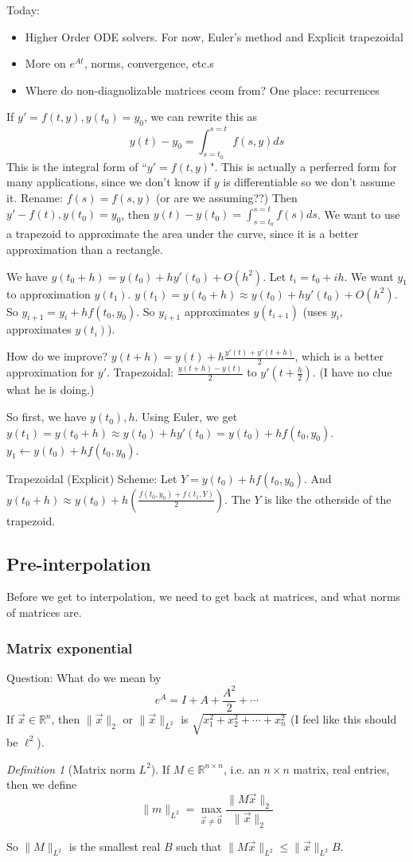 \documentclass{article}
\theoremstyle{plain}
\theoremstyle{remark}
\newtheorem{definition}{Definition}
\newcommand{\R}{{\mathbb R}}
\begin{document}
Today:
\begin{itemize}
	\item Higher Order ODE solvers. For now, Euler's method and Explicit trapezoidal
	\item More on $e^{At}$, norms, convergence, etc.s
	\item Where do non-diagnolizable matrices ceom from? One place: recurrences
\end{itemize}

If $y' = f(t,y), y(t_0) = y_0$,
we can rewrite this as
\[
	y(t) - y_0 = \int_{s=t_0}^{s=t} f(s,y) ds
\]
This is the integral form of ``$y' = f(t,y)$".
This is actually a perferred form for many applications,
since we don't know if $y$ is differentiable so we don't assume it.
Rename: $f(s) = f(s,y)$ (or are we assuming??)
Then $y' - f(t), y(t_0) = y_0$,
then $y(t) - y(t_0) = \int_{s=t_0}^{s=t} f(s)ds$.
We want to use a trapezoid to approximate the area under the curve,
since it is a better approximation than a rectangle.

We have $y(t_0 + h) = y(t_0) + hy'(t_0) + O(h^2)$.
Let $t_i = t_0 + ih$.
We want $y_1$ to approximation $y(t_1)$.
$y(t_1) = y(t_0 + h) \approx y(t_0) + hy'(t_0) + O(h^2)$.
So $y_{i+1} = y_i + hf(t_0,y_0)$.
So $y_{i+1}$ approximates $y(t_{i+1})$
(uses $y_i$, approximates $y(t_i)$).

How do we improve?
$y(t+h) = y(t) + h\frac{y'(t)+y'(t+h)}{2}$,
which is a better approximation for $y'$.
Trapezoidal:
$\frac{y(t+h)-y(t)}{2}$ to $y'(t+\frac{h}{2})$.
(I have no clue what he is doing.)

So first, we have $y(t_0), h$.
Using Euler, we get $y(t_1) = y(t_0+h)
\approx y(t_0) + hy'(t_0) = y(t_0) + hf(t_0,y_0)$.
$y_1 \leftarrow y(t_0) + hf(t_0,y_0)$.

Trapezoidal (Explicit) Scheme:
Let $Y = y(t_0) + hf(t_0,y_0)$.
And $y(t_0+h) \approx y(t_0) + h\left(\frac{f(t_0,y_0) + f(t_1,Y)}{2}\right)$.
The $Y$ is like the otherside of the trapezoid.

\subsection{Pre-interpolation}
Before we get to interpolation, we need to get back at matrices,
and what norms of matrices are.

\subsubsection{Matrix exponential}
Question: What do we mean by
\[
	e^A = I + A + \frac{A^2}{2} + \cdots
\]
If $\vec{x} \in \R^n$, then $\lVert \vec{x}\rVert_2$ or $\lVert \vec{x}\rVert_{L^2}$ is
$\sqrt{x_1^2 + x_2^2 + \cdots + x_n^2}$
(I feel like this should be $\ell^2$).
\begin{definition}[Matrix norm $L^2$]
	If $M \in \R^{n\times n}$, i.e. an $n \times n$ matrix, real entries,
	then we define
	\[
		\lVert m \rVert_{L^2} = \max_{\vec{x} \neq \vec{0}}
		\frac{\lVert M\vec{x} \rVert_2}{\lVert \vec{x} \rVert_2}
	\]
\end{definition}
So $\lVert M \rVert_{L^2}$ is the smallest real $B$ such that
$\lVert M \vec{x} \rVert_{L^2} \leq \lVert \vec{x} \rVert_{L^2}B$.
\end{document}
